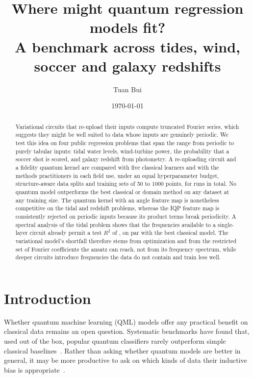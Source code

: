 \documentclass[11pt,letterpaper]{article}
\title{\bfseries Where might quantum regression models fit?\\[2pt]
\large A benchmark across tides, wind, soccer and galaxy redshifts}
\author{Tuan Bui}
\date{\today}
\begin{document}
\maketitle

\begin{abstract}
\noindent
Variational circuits that re-upload their inputs compute truncated Fourier series, which
suggests they might be well suited to data whose inputs are genuinely periodic. We test this
idea on four public regression problems that span the range from periodic to purely tabular
inputs: tidal water levels, wind-turbine power, the probability that a soccer shot is scored,
and galaxy redshift from photometry. A re-uploading circuit and a fidelity quantum kernel are
compared with five classical learners and with the methods practitioners in each field use,
under an equal hyperparameter budget, structure-aware data splits and training sets of 50 to
1000 points, for \nRuns{} runs in total. No quantum model outperforms the best classical or
domain method on any dataset at any training size. The quantum kernel with an angle feature
map is nonetheless competitive on the tidal and redshift problems, whereas the IQP feature map
is consistently rejected on periodic inputs because its product terms break periodicity. A
spectral analysis of the tidal problem shows that the frequencies available to a single-layer
circuit already permit a test $R^2$ of \ceilOne{}, on par with the best classical model. The
variational model's shortfall therefore stems from optimization and from the restricted set
of Fourier coefficients the ansatz can reach, not from its frequency spectrum, while deeper
circuits introduce frequencies the data do not contain and train less well.
\end{abstract}

\section{Introduction}

Whether quantum machine learning (QML) models offer any practical benefit on classical data
remains an open question. Systematic benchmarks have found that, used out of the box, popular
quantum classifiers rarely outperform simple classical baselines~\cite{bowles2024better}.
Rather than asking whether quantum models are better in general, it may be more productive to
ask on which kinds of data their inductive bias is appropriate~\cite{schuld2022advantage}.
\end{document}
